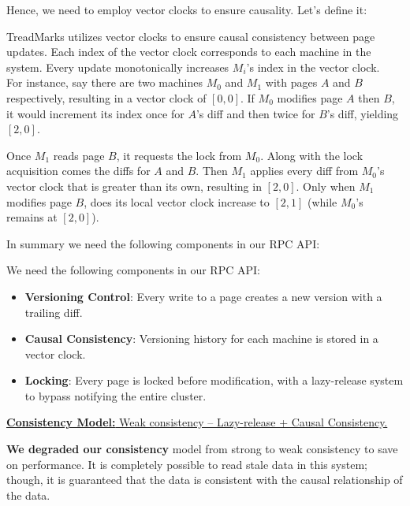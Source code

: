 \newpage 

\noindent
Hence, we need to employ vector clocks to ensure causality. Let's define it:
\begin{Def}

    TreadMarks utilizes vector clocks to ensure causal consistency between page updates.
    Each index of the vector clock corresponds to each machine in the system. Every update monotonically increases $M_i$'s index in the vector clock.\\

    \noindent
    For instance, say there are two machines $M_0$ and $M_1$ with pages $A$ and $B$ respectively, resulting in a vector clock of $[0,0]$.
    If $M_0$ modifies page $A$ then $B$, it would increment its index once for $A$'s diff and then twice for $B$'s diff, yielding $[2,0]$. 
    
    Once $M_1$ reads page $B$, 
    it requests the lock from $M_0$. Along with the lock acquisition comes the diffs for $A$ and $B$.
    Then $M_1$ applies every diff from $M_0$'s vector clock that is greater than its own, resulting in $[2,0]$. Only when $M_1$ modifies page $B$, does its local vector clock increase to $[2,1]$ (while $M_0$'s remains at $[2,0]$).
\end{Def}

\noindent
In summary we need the following components in our RPC API:
\begin{Def}

    We need the following components in our RPC API:

    \begin{itemize}
        \item \textbf{Versioning Control}: Every write to a page creates a new version with a trailing diff.
        \item \textbf{Causal Consistency}: Versioning history for each machine is stored in a vector clock.
        \item \textbf{Locking}: Every page is locked before modification, with a lazy-release system to bypass notifying the entire cluster.

    \end{itemize}

    \noindent
    \underline{\textbf{Consistency Model:} Weak consistency -- Lazy-release + Causal Consistency.}
\end{Def}

\noindent
\textbf{We degraded our consistency} model from strong to weak consistency to save on performance. It is completely 
possible to read stale data in this system; though, it is guaranteed that the data is consistent with the causal relationship of the data.